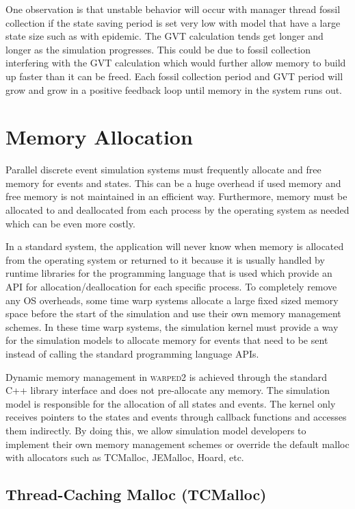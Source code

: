 \documentclass[11pt]{book}
\begin{document}
One observation is that unstable behavior will occur with manager thread fossil collection
if the state saving period is set very low with model that have a large state size such as with
epidemic. The GVT calculation tends get longer and longer as the simulation progresses. This could
be due to fossil collection interfering with the GVT calculation which would further allow memory
to build up faster than it can be freed. Each fossil collection period and GVT period will grow
and grow in a positive feedback loop until memory in the system runs out.


\section{Memory Allocation}

Parallel discrete event simulation systems must frequently allocate and free memory for
events and states. This can be a huge overhead if used memory and free memory is not
maintained in an efficient way. Furthermore, memory must be allocated to and deallocated from
each process by the operating system as needed which can be even more costly.

In a standard system, the application will never know when memory is allocated from the operating
system or returned to it because it is usually handled by runtime libraries for the programming
language that is used which provide an API for allocation/deallocation for each specific
process. To completely remove any OS overheads, some time warp systems allocate a large fixed
sized memory space before the start of the simulation and use their own memory management
schemes. In these time warp systems, the simulation kernel must provide a way for the simulation
models to allocate memory for events that need to be sent instead of calling the standard programming
language APIs.

Dynamic memory management in \textsc{warped2} is achieved through the standard C++ library
interface and does not pre-allocate any memory. The simulation model is responsible for the
allocation of all states and events. The kernel only receives pointers to the states and events
through callback functions and accesses them indirectly. By doing this, we allow simulation model
developers to implement their own memory management schemes or override the default malloc with
allocators such as TCMalloc, JEMalloc, Hoard, etc.

\subsection{Thread-Caching Malloc (TCMalloc)}
\end{document}
